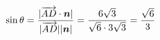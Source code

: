 \documentclass[preview]{standalone}
\begin{document}
\begin{align*}
\special{dvisvgm:raw <g id='unique000'>}\sin\theta=\frac{|\overrightarrow{AD}\cdot\boldsymbol{n}|}{|\overrightarrow{AD}||\boldsymbol{n}|}=\frac{6\sqrt{3}}{\sqrt{6}\cdot3\sqrt{3}}=\frac{\sqrt{6}}{3}\special{dvisvgm:raw </g>}
\end{align*}
\end{document}
